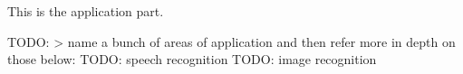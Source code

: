 This is the application part.

TODO: > name a bunch of areas of application and then refer more in depth on those below:
TODO: speech recognition
TODO: image recognition